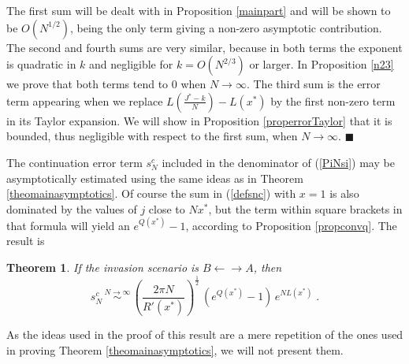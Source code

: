 \documentclass[12pt]{article}
\newtheorem{theorem}{Theorem}
\begin{document}
The first sum will be dealt with in Proposition \ref{mainpart} and will be shown to be  $O(N^{1/2})$, being the only term giving a non-zero asymptotic contribution. The second and fourth sums are very similar, because in both terms the exponent is quadratic in $k$ and negligible for $k=O(N^{2/3})$ or larger. In Proposition \ref{n23} we prove that both terms tend to 0 when $N \rightarrow \infty$. The third sum is the error term appearing when we replace $L(\frac{J^{\ast}-k}{N})-L(x^{\ast})$ by the first non-zero term in its Taylor expansion. We will show in Proposition \ref{properrorTaylor} that it is bounded, thus negligible with respect to the first sum, when $N \rightarrow \infty$.
$\blacksquare$

The continuation error term $s_N^c$ included in the denominator of (\ref{PiNsi}) may be asymptotically estimated using the same ideas as in Theorem \ref{theomainasymptotics}. Of course the sum in (\ref{defsnc}) with $x=1$ is also dominated by the values of $j$ close to $N x^{\ast}$, but the term within square brackets in that formula will yield an $e^{Q(x^{\ast})}-1$, according to Proposition \ref{propconvq}. The result is
\begin{theorem}
	\label{theocontasymptotics}
	If the invasion scenario is $B\leftarrow \rightarrow A$, then
	\begin{equation}
	\label{asympformsnc}
	s_N^c \,\stackrel{N \rightarrow \infty}{\sim} \, \left(\frac{2\pi N}{R'(x^{\ast})}\right)^{\frac{1}{2}} \,(e^{Q(x^{\ast})}-1)\, e^{N L(x^{\ast})} \;.
	\end{equation}
\end{theorem}

As the ideas used in the proof of this result are a mere repetition of the ones used in proving Theorem \ref{theomainasymptotics}, we will not present them.
\end{document}
